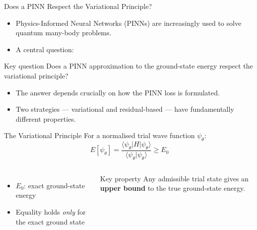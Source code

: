 \documentclass[aspectratio=169,10pt]{beamer}
\begin{document}
\begin{frame}{Does a PINN Respect the Variational Principle?}
  \begin{itemize}
    \item Physics-Informed Neural Networks (PINNs) are increasingly used
          to solve quantum many-body problems.
    \item A central question:
  \end{itemize}

  \vspace{0.2cm}
  \begin{block}{Key question}
    Does a PINN approximation to the ground-state energy respect the
    variational principle?
  \end{block}

  \vspace{0.2cm}
  \begin{itemize}
    \item The answer depends crucially on how the PINN loss is formulated.
    \item Two strategies — \alert{variational} and \alert{residual-based} —
          have fundamentally different properties.
  \end{itemize}
\end{frame}

\begin{frame}{The Variational Principle}
  For a normalised trial wave function $\psi_\theta$:
  \[
    E[\psi_\theta]
    = \frac{\langle\psi_\theta|H|\psi_\theta\rangle}
           {\langle\psi_\theta|\psi_\theta\rangle}
    \geq E_0
  \]

  \begin{columns}[T]
      \begin{itemize}
        \item $E_0$: exact ground-state energy
        \item Equality holds \emph{only} for the exact ground state
      \end{itemize}
      \begin{block}{Key property}
        Any admissible trial state gives an \textbf{upper bound} to the
        true ground-state energy.
      \end{block}
  \end{columns}
\end{frame}
\end{document}
